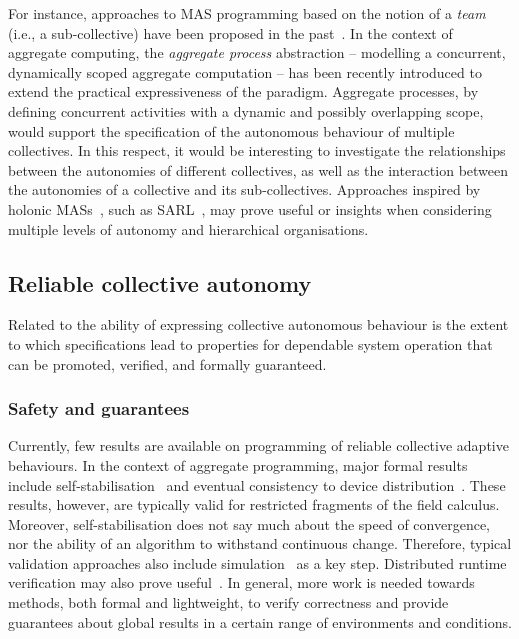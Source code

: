 For instance, approaches to MAS programming 
 based on the notion of a \emph{team} (i.e., a sub-collective)
 have been proposed in the past~\cite{DBLP:conf/atal/PynadathTCC99,DBLP:journals/jnca/JarvisRMJ06,DBLP:conf/mobiquitous/KoutsoubeliasL16}.
%
In the context of aggregate computing,
 the \emph{aggregate process} abstraction
 -- modelling a concurrent, dynamically scoped aggregate computation --
 has been recently introduced to extend the
 practical expressiveness of the paradigm.
%
Aggregate processes,
 by defining concurrent activities
 with a dynamic and possibly overlapping scope,
 would support
 the specification of the autonomous behaviour
 of multiple collectives.
%
In this respect,
 it would be interesting to investigate
 the relationships between the autonomies of different collectives,
 as well as the interaction between the autonomies
 of a collective and its sub-collectives.
%
Approaches inspired by holonic MASs~\cite{DBLP:series/ncs/RodriguezHGGK11},
 such as SARL~\cite{DBLP:conf/webi/RodriguezGG14},
 may prove useful or insights when considering multiple levels of autonomy and
 hierarchical organisations.
 

\subsection{Reliable collective autonomy}
\label{gaps:reliability}

Related to the ability of expressing collective autonomous behaviour
 is the extent to which specifications lead to properties 
 for dependable system operation that can be 
 promoted, verified, and formally guaranteed.

\subsubsection{Safety and guarantees}

Currently, few results are available 
 on programming of reliable collective adaptive behaviours.
%
In the context of aggregate programming,
 major formal results 
 include self-stabilisation~\cite{DBLP:journals/tomacs/ViroliABDP18}
 and eventual consistency to device distribution~\cite{DBLP:journals/taas/BealVPD17}.
%
These results, however, are typically valid for restricted fragments of the field calculus.
%
Moreover, 
 self-stabilisation does not say much about
 the speed of convergence,
 nor the ability of an algorithm to withstand continuous change.
%
Therefore, 
 typical validation approaches also include
 simulation~\cite{mittal2017simulation-cas} as a key step.
%
Distributed runtime verification may also prove useful~\cite{audrito2021drv-slcs-fc}.
%
In general, more work is needed 
 towards methods, both formal and lightweight,
 to verify correctness and provide guarantees
 about global results in a certain range of environments
 and conditions.



